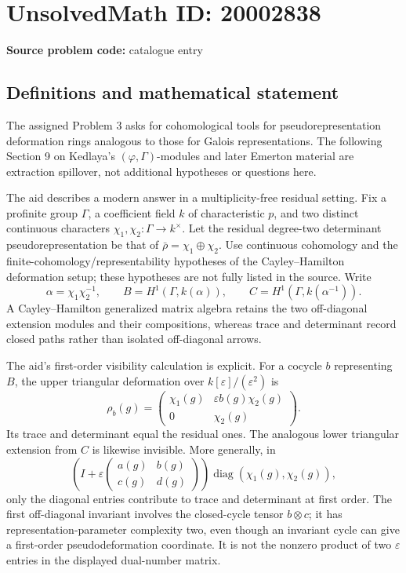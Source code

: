 \documentclass[11pt]{article}
\begin{document}
\section*{UnsolvedMath ID: 20002838}
\textbf{Source problem code:} catalogue entry
\subsection{Definitions and mathematical statement}
The assigned Problem 3 asks for cohomological tools for pseudorepresentation deformation rings analogous to those for Galois representations. The following Section 9 on Kedlaya's $(\varphi,\Gamma)$-modules and later Emerton material are extraction spillover, not additional hypotheses or questions here.

The aid describes a modern answer in a multiplicity-free residual setting. Fix a profinite group $\Gamma$, a coefficient field $k$ of characteristic $p$, and two distinct continuous characters $\chi_1,\chi_2:\Gamma\to k^\times$. Let the residual degree-two determinant pseudorepresentation be that of $\bar\rho=\chi_1\oplus\chi_2$. Use continuous cohomology and the finite-cohomology/representability hypotheses of the Cayley--Hamilton deformation setup; these hypotheses are not fully listed in the source. Write
\[
 \alpha=\chi_1\chi_2^{-1},\qquad
 B=H^1(\Gamma,k(\alpha)),\qquad
 C=H^1(\Gamma,k(\alpha^{-1})).
\]
A Cayley--Hamilton generalized matrix algebra retains the two off-diagonal extension modules and their compositions, whereas trace and determinant record closed paths rather than isolated off-diagonal arrows.

The aid's first-order visibility calculation is explicit. For a cocycle $b$ representing $B$, the upper triangular deformation over $k[\varepsilon]/(\varepsilon^2)$ is
\[
 \rho_b(g)=\begin{pmatrix}
  \chi_1(g)&\varepsilon b(g)\chi_2(g)\\0&\chi_2(g)
 \end{pmatrix}.
\]
Its trace and determinant equal the residual ones. The analogous lower triangular extension from $C$ is likewise invisible. More generally, in
\[
 (I+\varepsilon\begin{pmatrix}a(g)&b(g)\\c(g)&d(g)\end{pmatrix})
       \operatorname{diag}(\chi_1(g),\chi_2(g)),
\]
only the diagonal entries contribute to trace and determinant at first order. The first off-diagonal invariant involves the closed-cycle tensor $b\otimes c$; it has representation-parameter complexity two, even though an invariant cycle can give a first-order pseudodeformation coordinate. It is not the nonzero product of two $\varepsilon$ entries in the displayed dual-number matrix.
\end{document}
